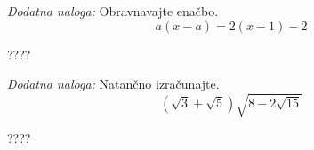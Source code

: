 \documentclass[addpoints,12pt]{exam}
\begin{document}
\begin{questions}






     \newpage



    \bonusquestion[2]
    \textit{Dodatna naloga:} Obravnavajte enačbo. $$a(x-a)=2(x-1)-2$$

    \begin{solution}[10cm]
        ????
    \end{solution}




        

    \bonusquestion[2]
    \textit{Dodatna naloga:} Natančno izračunajte. $$ \left(\sqrt{3}+\sqrt{5}\right)\sqrt{8-2\sqrt{15}} $$

    \begin{solution}[7cm]
        ????
    \end{solution}




\end{questions}
\end{document}
